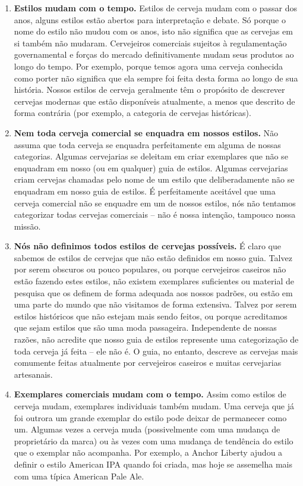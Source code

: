\begin{enumerate}
\item \textbf{Estilos mudam com o tempo.} Estilos de cerveja mudam com o passar dos anos, alguns estilos estão abertos para interpretação e debate. Só porque o nome do estilo não mudou com os anos, isto não significa que as cervejas em si também não mudaram. Cervejeiros comerciais sujeitos à regulamentação governamental e forças do mercado definitivamente mudam seus produtos ao longo do tempo. Por exemplo, porque temos agora uma cerveja conhecida como porter não significa que ela sempre foi feita desta forma ao longo de sua história. Nossos estilos de cerveja geralmente têm o propósito de descrever cervejas modernas que estão disponíveis atualmente, a menos que descrito de forma contrária (por exemplo, a categoria de cervejas históricas).
\item \textbf{Nem toda cerveja comercial se enquadra em nossos estilos.} Não assuma que toda cerveja se enquadra perfeitamente em alguma de nossas categorias. Algumas cervejarias se deleitam em criar exemplares que não se enquadram em nosso (ou em qualquer) guia de estilos. Algumas cervejarias criam cervejas chamadas pelo nome de um estilo que deliberadamente não se enquadram em nosso guia de estilos. É perfeitamente aceitável que uma cerveja comercial não se enquadre em um de nossos estilos, nós não tentamos categorizar todas cervejas comerciais – não é nossa intenção, tampouco nossa missão.
\item \textbf{Nós não definimos todos estilos de cervejas possíveis.} É claro que sabemos de estilos de cervejas que não estão definidos em nosso guia. Talvez por serem obscuros ou pouco populares, ou porque cervejeiros caseiros não estão fazendo estes estilos, não existem exemplares suficientes ou material de pesquisa que os definem de forma adequada aos nossos padrões, ou estão em uma parte do mundo que não visitamos de forma extensiva. Talvez por serem estilos históricos que não estejam mais sendo feitos, ou porque acreditamos que sejam estilos que são uma moda passageira. Independente de nossas razões, não acredite que nosso guia de estilos represente uma categorização de toda cerveja já feita – ele não é. O guia, no entanto, descreve as cervejas mais comumente feitas atualmente por cervejeiros caseiros e muitas cervejarias artesanais.
\item \textbf{Exemplares comerciais mudam com o tempo.} Assim como estilos de cerveja mudam, exemplares individuais também mudam. Uma cerveja que já foi outrora um grande exemplar do estilo pode deixar de permanecer como um. Algumas vezes a cerveja muda (possivelmente com uma mudança de proprietário da marca) ou às vezes com uma mudança de tendência do estilo que o exemplar não acompanha. Por exemplo, a Anchor Liberty ajudou a definir o estilo American IPA quando foi criada, mas hoje se assemelha mais com uma típica American Pale Ale.

\end{enumerate}
